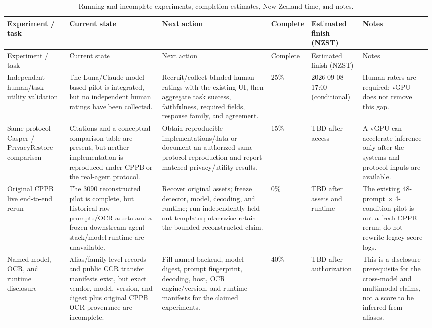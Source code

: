 \documentclass[11pt]{article}
\begin{document}
\begin{longtable}{p{}p{}p{}p{}p{}p{}}
\caption{Running and incomplete experiments, completion estimates, New Zealand time, and notes.}\label{tab:next_steps}\\
\toprule
Experiment / task & Current state & Next action & Complete & Estimated finish (NZST) & Notes \\
\midrule
\endfirsthead
\toprule
Experiment / task & Current state & Next action & Complete & Estimated finish (NZST) & Notes \\
\midrule
\endhead
\bottomrule
\endfoot
Independent human/task utility validation & The Luna/Claude model-based pilot is integrated, but no independent human ratings have been collected. & Recruit/collect blinded human ratings with the existing UI, then aggregate task success, faithfulness, required fields, response family, and agreement. & 25\% & 2026-09-08 17:00 (conditional) & Human raters are required; vGPU does not remove this gap. \\
Same-protocol Casper / PrivacyRestore comparison & Citations and a conceptual comparison table are present, but neither implementation is reproduced under CPPB or the real-agent protocol. & Obtain reproducible implementations/data or document an authorized same-protocol reproduction and report matched privacy/utility results. & 15\% & TBD after access & A vGPU can accelerate inference only after the systems and protocol inputs are available. \\
Original CPPB live end-to-end rerun & The 3090 reconstructed pilot is complete, but historical raw prompts/OCR assets and a frozen downstream agent-stack/model runtime are unavailable. & Recover original assets; freeze detector, model, decoding, and runtime; run independently held-out templates; otherwise retain the bounded reconstructed claim. & 0\% & TBD after assets and runtime & The existing 48-prompt $\times$ 4-condition pilot is not a fresh CPPB rerun; do not rewrite legacy score logs. \\
Named model, OCR, and runtime disclosure & Alias/family-level records and public OCR transfer manifests exist, but exact vendor, model, version, and digest plus original CPPB OCR provenance are incomplete. & Fill named backend, model digest, prompt fingerprint, decoding, host, OCR engine/version, and runtime manifests for the claimed experiments. & 40\% & TBD after authorization & This is a disclosure prerequisite for the cross-model and multimodal claims, not a score to be inferred from aliases. \\

\end{longtable}
\end{document}
